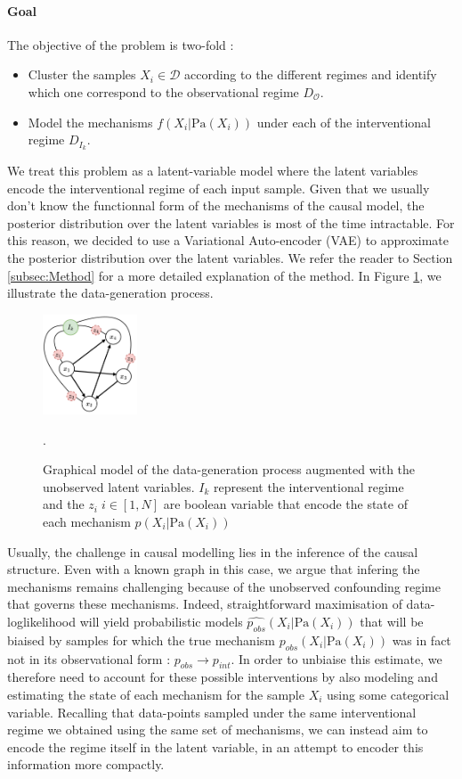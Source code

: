 \documentclass{article}
\begin{document}
\paragraph{Goal}The objective of the problem is two-fold :
\begin{itemize}
    \item Cluster the samples $X_i \in \mathcal{D}$ according to the different regimes and identify which one correspond to the observational regime $D_{\mathcal{O}}$.
    \item Model the mechanisms $f(X_i | \text{Pa}(X_i))$ under each of the interventional regime $D_{I_k}$.
\end{itemize}
We treat this problem as a latent-variable model where the latent variables encode the interventional regime of each input sample. Given that we usually don't know the functionnal form of the mechanisms of the causal model, the posterior distribution over the latent variables is most of the time intractable. For this reason, we decided to use a Variational Auto-encoder (VAE) to approximate the posterior distribution over the latent variables. We refer the reader to Section \ref{subsec:Method} for a more detailed explanation of the method. In Figure \ref{fig:DAG}, we illustrate the data-generation process.
\begin{figure}
    \centering
        \includegraphics[width=0.25\textwidth]{images/DAG.pdf}
        \caption{Graphical model of the data-generation process augmented with the unobserved latent variables. $I_k$ represent the interventional regime and the $z_i \; i \in [1,N]$ are boolean variable that encode the state of each mechanism $p(X_i | \text{Pa}(X_i))$}.
        \label{fig:DAG}
    \end{figure}
Usually, the challenge in causal modelling lies in the inference of the causal structure. Even with a known graph in this case, we argue that infering the mechanisms remains challenging because of the unobserved confounding regime that governs these mechanisms. Indeed, straightforward maximisation of data-loglikelihood will yield probabilistic models $\hat{p_{obs}}(X_i | \text{Pa}(X_i))$ that will be biaised by samples for which the true mechanism $p_{obs}(X_i | \text{Pa}(X_i))$ was in fact not in its observational form : $p_{obs} \rightarrow p_{int}$.
In order to unbiaise this estimate, we therefore need to account for these possible interventions by also modeling and estimating the state of each mechanism for the sample $X_i$ using some categorical variable. Recalling that data-points sampled under the same interventional regime we obtained using the same set of mechanisms, we can instead aim to encode the regime itself in the latent variable, in an attempt to encoder this information more compactly.
\end{document}
